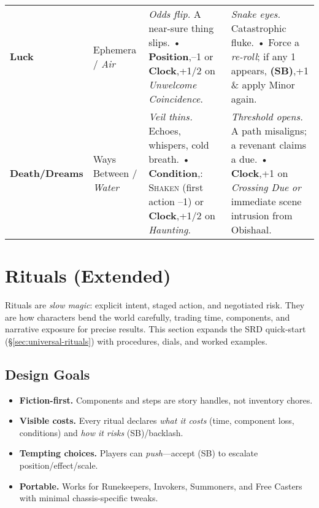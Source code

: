 \begin{table}[h]
\begin{tabularx}{\linewidth}{>{\bfseries}l l >{\raggedright}X >{\raggedright}X}
Luck & Ephemera / \emph{Air} & \emph{Odds flip.} A near-sure thing slips. • \textbf{Position},–1 or \textbf{Clock},+1/2 on \emph{Unwelcome Coincidence}. & \emph{Snake eyes.} Catastrophic fluke. • Force a \emph{re-roll}; if any 1 appears, \textbf{(SB)},+1 \& apply Minor again. \\
Death/Dreams & Ways Between / \emph{Water} & \emph{Veil thins.} Echoes, whispers, cold breath. • \textbf{Condition},: \textsc{Shaken} (first action –1) or \textbf{Clock},+1/2 on \emph{Haunting}. & \emph{Threshold opens.} A path misaligns; a revenant claims a due. • \textbf{Clock},+1 on \emph{Crossing Due} \emph{or} immediate scene intrusion from Obishaal. \\
\bottomrule
\end{tabularx}
\end{table}


\section{Rituals (Extended)}\label{sec:rituals-extended}

Rituals are \emph{slow magic}: explicit intent, staged action, and negotiated risk. They are how characters bend the world carefully, trading time, components, and narrative exposure for precise results. This section expands the SRD quick-start (\S\ref{sec:universal-rituals}) with procedures, dials, and worked examples.

\subsection{Design Goals}\label{subsec:ritual-goals}
\begin{itemize}
\item \textbf{Fiction-first.} Components and steps are story handles, not inventory chores.
\item \textbf{Visible costs.} Every ritual declares \emph{what it costs} (time, component loss, conditions) and \emph{how it risks} (SB)/backlash.
\item \textbf{Tempting choices.} Players can \emph{push}—accept (SB) to escalate position/effect/scale.
\item \textbf{Portable.} Works for Runekeepers, Invokers, Summoners, and Free Casters with minimal chassis-specific tweaks.
\end{itemize}

